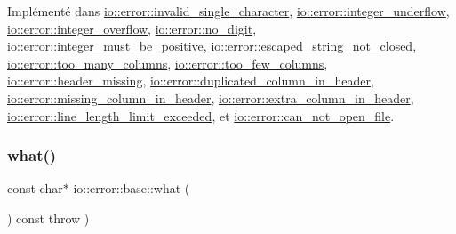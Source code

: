 Implémenté dans \hyperlink{structio_1_1error_1_1invalid__single__character_a074ab35a8013ad15041a9bb9188e69bf}{io\+::error\+::invalid\+\_\+single\+\_\+character}, \hyperlink{structio_1_1error_1_1integer__underflow_a2ded9c7e982403877055514543207847}{io\+::error\+::integer\+\_\+underflow}, \hyperlink{structio_1_1error_1_1integer__overflow_a25825600c3c29210160ba201519e6312}{io\+::error\+::integer\+\_\+overflow}, \hyperlink{structio_1_1error_1_1no__digit_a469275c63f67171903f9cdb2418da5b3}{io\+::error\+::no\+\_\+digit}, \hyperlink{structio_1_1error_1_1integer__must__be__positive_af6daaa02512141958a3eafd0c07232ef}{io\+::error\+::integer\+\_\+must\+\_\+be\+\_\+positive}, \hyperlink{structio_1_1error_1_1escaped__string__not__closed_a696911cd3cfaf8a30a728101b076028d}{io\+::error\+::escaped\+\_\+string\+\_\+not\+\_\+closed}, \hyperlink{structio_1_1error_1_1too__many__columns_a2072af07b0408387579becc076a9809e}{io\+::error\+::too\+\_\+many\+\_\+columns}, \hyperlink{structio_1_1error_1_1too__few__columns_a58d6d1fada127120facbcc00851ab455}{io\+::error\+::too\+\_\+few\+\_\+columns}, \hyperlink{structio_1_1error_1_1header__missing_ae130d632556617cf136cc4392b517b30}{io\+::error\+::header\+\_\+missing}, \hyperlink{structio_1_1error_1_1duplicated__column__in__header_a213825695d770d3ee2ee7bb9a2bfa818}{io\+::error\+::duplicated\+\_\+column\+\_\+in\+\_\+header}, \hyperlink{structio_1_1error_1_1missing__column__in__header_a1a2bd4e01a389cb50c6bfae8443317fd}{io\+::error\+::missing\+\_\+column\+\_\+in\+\_\+header}, \hyperlink{structio_1_1error_1_1extra__column__in__header_ab7bb962a470c429206c51729fbf114dd}{io\+::error\+::extra\+\_\+column\+\_\+in\+\_\+header}, \hyperlink{structio_1_1error_1_1line__length__limit__exceeded_ae6ef1cf3ed1d82804953ac120892b85e}{io\+::error\+::line\+\_\+length\+\_\+limit\+\_\+exceeded}, et \hyperlink{structio_1_1error_1_1can__not__open__file_a0249122edaf123e9fa4baabe8128806c}{io\+::error\+::can\+\_\+not\+\_\+open\+\_\+file}.

\mbox{\label{structio_1_1error_1_1base_a35483dfbe91cea45cfa7c5613e83e5ef}} 
\subsubsection{\texorpdfstring{what()}{what()}}
{\footnotesize\ttfamily const char$\ast$ io\+::error\+::base\+::what (\begin{DoxyParamCaption}{ }\end{DoxyParamCaption}) const throw  ) \hspace{0.3cm}{\ttfamily [inline]}}



